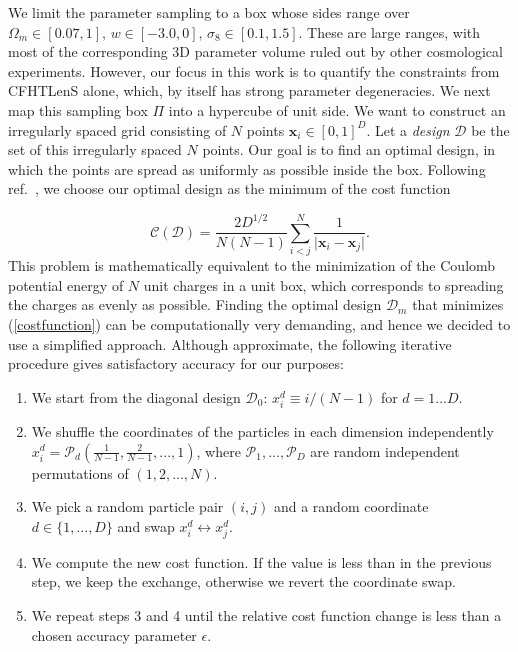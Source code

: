 \documentclass[reprint,aps,prd,superscriptaddress,showkeys,showpacs]{revtex4-1}
\begin{document}
We limit the parameter sampling to a box whose sides range over
$\Omega_m\in[0.07,1],\,w\in[-3.0,0],\,\sigma_8\in[0.1,1.5]$.  These
are large ranges, with most of the corresponding 3D parameter volume
ruled out by other cosmological experiments. However, our focus in
this work is to quantify the constraints from CFHTLenS alone, which,
by itself has strong parameter degeneracies.
We next map this sampling box $\Pi$ into a hypercube of unit side. We
want to construct an irregularly spaced grid consisting of $N$ points
$\mathbf{x}_i\in[0,1]^D$. Let a \textit{design} $\mathcal{D}$ be the
set of this irregularly spaced $N$ points. Our goal is to find an
optimal design, in which the points are spread as uniformly as
possible inside the box. Following ref.~\citep{coyote2}, we choose our
optimal design as the minimum of the cost function

\begin{equation}
\label{costfunction}
\mathcal{C}(\mathcal{D}) = \frac{2D^{1/2}}{N(N-1)}\sum_{i<j}^N\frac{1}{\vert\mathbf{x}_i-\mathbf{x}_j\vert}.
\end{equation} 
This problem is mathematically equivalent to the minimization of the
Coulomb potential energy of $N$ unit charges in a unit box, which
corresponds to spreading the charges as evenly as possible.
Finding the optimal design $\mathcal{D}_m$ that minimizes
(\ref{costfunction}) can be computationally very demanding, and hence
we decided to use a simplified approach. Although approximate, the
following iterative procedure gives satisfactory accuracy for our purposes:

\begin{enumerate}
\item We start from the diagonal design $\mathcal{D}_0$:
$x_i^d\equiv i/(N-1)$ for $d=1...D$.
\item We shuffle the coordinates of the particles in each dimension independently $x_i^d = \mathcal{P}_d\left(\frac{1}{N-1},\frac{2}{N-1},...,1\right)$, where $\mathcal{P}_1,...,\mathcal{P}_D$ are random independent permutations of $(1,2,...,N)$.
\item We pick a random particle pair $(i,j)$ and a random coordinate $d\in\{1,...,D\}$ and swap $x_i^d\leftrightarrow x_j^d$.
\item We compute the new cost function. If the value is less than in the previous step, we keep the exchange, otherwise we revert the coordinate swap.
\item We repeat steps 3 and 4 until the relative cost function change is less than a chosen accuracy parameter $\epsilon$.
\end{enumerate}
\end{document}
